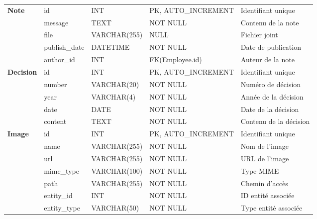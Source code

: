 \begin{longtable}{|p{2.5cm}|p{3cm}|p{3cm}|p{3cm}|p{3cm}|}
    \multirow{4}{*}{\textbf{Note}} & id & INT & PK, AUTO\_INCREMENT & Identifiant unique \\
    \cline{2-5}
    & message & TEXT & NOT NULL & Contenu de la note \\
    \cline{2-5}
    & file & VARCHAR(255) & NULL & Fichier joint \\
    \cline{2-5}
    & publish\_date & DATETIME & NOT NULL & Date de publication \\
    \cline{2-5}
    & author\_id & INT & FK(Employee.id) & Auteur de la note \\
    \hline

    \multirow{5}{*}{\textbf{Decision}} & id & INT & PK, AUTO\_INCREMENT & Identifiant unique \\
    \cline{2-5}
    & number & VARCHAR(20) & NOT NULL & Numéro de décision \\
    \cline{2-5}
    & year & VARCHAR(4) & NOT NULL & Année de la décision \\
    \cline{2-5}
    & date & DATE & NOT NULL & Date de la décision \\
    \cline{2-5}
    & content & TEXT & NOT NULL & Contenu de la décision \\
    \hline

    \multirow{6}{*}{\textbf{Image}} & id & INT & PK, AUTO\_INCREMENT & Identifiant unique \\
    \cline{2-5}
    & name & VARCHAR(255) & NOT NULL & Nom de l'image \\
    \cline{2-5}
    & url & VARCHAR(255) & NOT NULL & URL de l'image \\
    \cline{2-5}
    & mime\_type & VARCHAR(100) & NOT NULL & Type MIME \\
    \cline{2-5}
    & path & VARCHAR(255) & NOT NULL & Chemin d'accès \\
    \cline{2-5}
    & entity\_id & INT & NOT NULL & ID entité associée \\
    \cline{2-5}
    & entity\_type & VARCHAR(50) & NOT NULL & Type entité associée \\
    \hline
\end{longtable}
\begin{center}  
    \label{tab:table_dictionnaire_data_ameliore}  
\end{center}